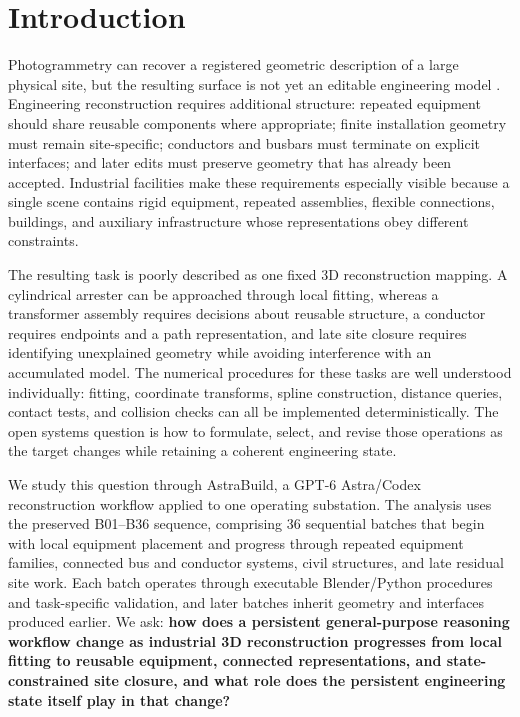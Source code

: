 \documentclass[10pt,a4paper]{article}
\begin{document}
\hypertarget{introduction}{%
\section{Introduction}\label{introduction}}

Photogrammetry can recover a registered geometric description of a large
physical site, but the resulting surface is not yet an editable
engineering model \citep{schonberger2016sfm}. Engineering reconstruction
requires additional structure: repeated equipment should share reusable
components where appropriate; finite installation geometry must remain
site-specific; conductors and busbars must terminate on explicit
interfaces; and later edits must preserve geometry that has already been
accepted. Industrial facilities make these requirements especially
visible because a single scene contains rigid equipment, repeated
assemblies, flexible connections, buildings, and auxiliary
infrastructure whose representations obey different constraints.

The resulting task is poorly described as one fixed 3D reconstruction
mapping. A cylindrical arrester can be approached through local fitting,
whereas a transformer assembly requires decisions about reusable
structure, a conductor requires endpoints and a path representation, and
late site closure requires identifying unexplained geometry while
avoiding interference with an accumulated model. The numerical
procedures for these tasks are well understood individually: fitting,
coordinate transforms, spline construction, distance queries, contact
tests, and collision checks can all be implemented deterministically.
The open systems question is how to formulate, select, and revise those
operations as the target changes while retaining a coherent engineering
state.

We study this question through AstraBuild, a GPT-6 Astra/Codex
reconstruction workflow applied to one operating substation. The
analysis uses the preserved B01--B36 sequence, comprising 36 sequential
batches that begin with local equipment placement and progress through
repeated equipment families, connected bus and conductor systems, civil
structures, and late residual site work. Each batch operates through
executable Blender/Python procedures and task-specific validation, and
later batches inherit geometry and interfaces produced earlier. We ask:
\textbf{how does a persistent general-purpose reasoning workflow change
as industrial 3D reconstruction progresses from local fitting to
reusable equipment, connected representations, and state-constrained
site closure, and what role does the persistent engineering state itself
play in that change?}
\end{document}
